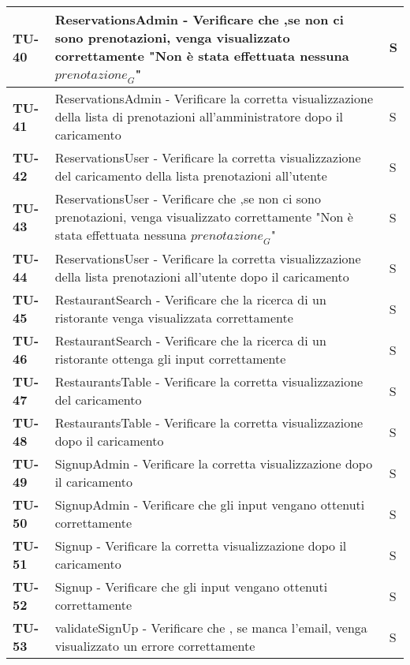\begin{longtable}{|>{\centering\arraybackslash}p{1.5cm}|p{15cm}|p{1cm}|}
  \hline
  \rowcolor{gray!10}
  \textbf{TU-40} & ReservationsAdmin - Verificare che ,se non ci sono prenotazioni, venga visualizzato correttamente "Non è stata effettuata nessuna $\textit{prenotazione}_G$"  & S \\
  \hline
  \rowcolor{gray!10}
  \textbf{TU-41} & ReservationsAdmin - Verificare la corretta visualizzazione della lista di prenotazioni all'amministratore dopo il caricamento & S \\
  \hline
  \rowcolor{gray!10}
  \textbf{TU-42} & ReservationsUser - Verificare la corretta visualizzazione del caricamento della lista prenotazioni all'utente & S \\
  \hline
  \rowcolor{gray!10}
  \textbf{TU-43} & ReservationsUser - Verificare che ,se non ci sono prenotazioni, venga visualizzato correttamente "Non è stata effettuata nessuna $\textit{prenotazione}_G$"  & S \\
  \hline
  \rowcolor{gray!10}
  \textbf{TU-44} & ReservationsUser - Verificare la corretta visualizzazione della lista prenotazioni all'utente dopo il caricamento  & S \\
  \hline
  \rowcolor{gray!10}
  \textbf{TU-45} & RestaurantSearch - Verificare che la ricerca di un ristorante venga visualizzata correttamente  & S \\
  \hline
  \rowcolor{gray!10}
  \textbf{TU-46} & RestaurantSearch - Verificare che la ricerca di un ristorante ottenga gli input correttamente  & S \\
  \hline
  \rowcolor{gray!10}
  \textbf{TU-47} & RestaurantsTable - Verificare la corretta visualizzazione del caricamento  & S \\
  \hline
  \rowcolor{gray!10}
  \textbf{TU-48} & RestaurantsTable - Verificare la corretta visualizzazione dopo il caricamento  & S \\
  \hline
  \rowcolor{gray!10}
  \textbf{TU-49} & SignupAdmin - Verificare la corretta visualizzazione dopo il caricamento  & S \\
  \hline
  \rowcolor{gray!10}
  \textbf{TU-50} & SignupAdmin - Verificare che gli input vengano ottenuti correttamente  & S \\
  \hline
  \rowcolor{gray!10}
  \textbf{TU-51} & Signup - Verificare la corretta visualizzazione dopo il caricamento  & S \\
  \hline
  \rowcolor{gray!10}
  \textbf{TU-52} & Signup - Verificare che gli input vengano ottenuti correttamente  & S \\
  \hline
  \rowcolor{gray!10}
  \textbf{TU-53} & validateSignUp - Verificare che , se manca l'email, venga visualizzato un errore correttamente  & S \\

\end{longtable}
